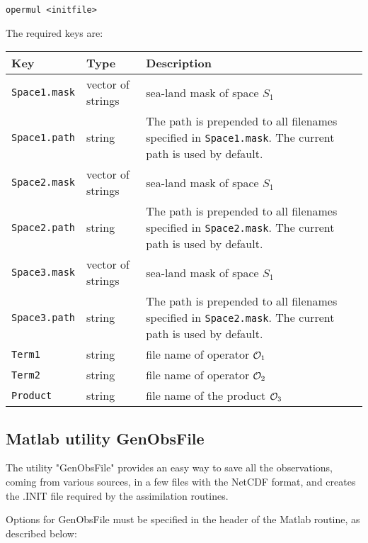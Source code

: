 \documentclass[a4paper,12pt]{article}
\newcommand{\code}{\texttt}
\newenvironment{keytabular}{\begin{tabular}{|p{0.3\textwidth}|p{0.2\textwidth}|p{0.5\textwidth}|} \hline Key & Type & Description \\ \hline \hline }{\end{tabular}}
\begin{document}
\begin{verbatim}
opermul <initfile>
\end{verbatim}

The required keys are: \\

\begin{keytabular}
\code{Space1.mask} & vector of strings &  sea-land mask of space $S_1$ 
\\
\code{Space1.path} & string & The path is prepended to all filenames
specified in \code{Space1.mask}. The current path is used by default.
\\
\code{Space2.mask} & vector of strings &  sea-land mask of space $S_1$ 
\\
\code{Space2.path} & string & The path is prepended to all filenames
specified in \code{Space2.mask}. The current path is used by default.
\\
\code{Space3.mask} & vector of strings &  sea-land mask of space $S_1$ 
\\
\code{Space3.path} & string & The path is prepended to all filenames
specified in \code{Space2.mask}. The current path is used by default.
\\
\code{Term1} & string & file name of operator ${\cal O}_1$
\\
\code{Term2} & string & file name of operator ${\cal O}_2$
\\
\code{Product} & string & file name of the product ${\cal O}_3$
\\
\hline
\end{keytabular}

\subsection{Matlab utility GenObsFile}

The utility "GenObsFile" provides an easy way to save all the observations, coming from various sources, in a few files with the NetCDF format, and creates the .INIT file required by the assimilation routines.

Options for GenObsFile must be specified in the header of the Matlab routine, as described below:
\end{document}
